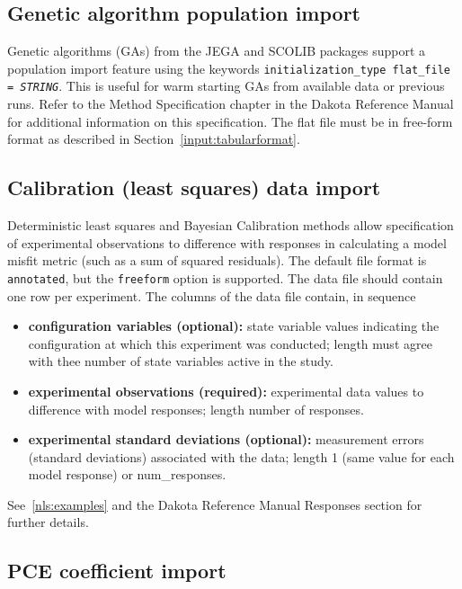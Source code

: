 \subsection{Genetic algorithm population import}

Genetic algorithms (GAs) from the JEGA and SCOLIB packages support a
population import feature using the keywords
\texttt{initialization\_type flat\_file = \emph{STRING}}.  This is
useful for warm starting GAs from available data or previous runs.
Refer to the Method Specification chapter in the Dakota Reference
Manual~\cite{RefMan} for additional information on this specification.
The flat file must be in free-form format as described in
Section~\ref{input:tabularformat}.

\subsection{Calibration (least squares) data import}

Deterministic least squares and Bayesian Calibration methods allow
specification of experimental observations to difference with
responses in calculating a model misfit metric (such as a sum of
squared residuals).  The default file format is {\tt annotated}, but
the {\tt freeform} option is supported.  The data file should contain
one row per experiment.   The columns of the data file contain, in sequence
\begin{itemize}
\item {\bf configuration variables (optional):} state variable values
  indicating the configuration at which this experiment was conducted;
  length must agree with thee number of state variables active in the
  study.
\item {\bf experimental observations (required):} experimental data
  values to difference with model responses; length number of
  responses.
\item {\bf experimental standard deviations (optional):} measurement
  errors (standard deviations) associated with the data; length 1
  (same value for each model response) or num\_responses.
\end{itemize}
See~\ref{nls:examples} and the Dakota Reference Manual Responses
section for further details.

\subsection{PCE coefficient import}

